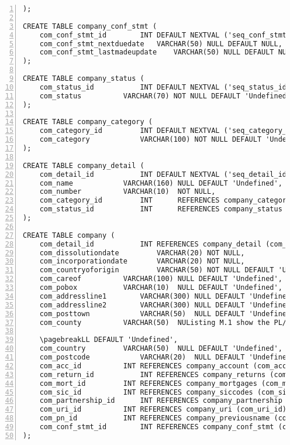\begin{lstlisting}[breaklines, frame=single, numbers=left, caption={PL/pgSQL's DDL scripts for Company Normalized Table Creation.}, label=commandline-02]
); 

CREATE TABLE company_conf_stmt (
	com_conf_stmt_id	 	INT DEFAULT NEXTVAL ('seq_conf_stmt_id') PRIMARY KEY, 
	com_conf_stmt_nextduedate	VARCHAR(50) NULL DEFAULT NULL,
	com_conf_stmt_lastmadeupdate 	VARCHAR(50) NULL DEFAULT NULL
);

CREATE TABLE company_status ( 
	com_status_id	 		INT DEFAULT NEXTVAL ('seq_status_id') PRIMARY KEY, 
	com_status 			VARCHAR(70) NOT NULL DEFAULT 'Undefined'
);

CREATE TABLE company_category ( 
	com_category_id		 	INT DEFAULT NEXTVAL ('seq_category_id') PRIMARY KEY, 
	com_category 			VARCHAR(100) NOT NULL DEFAULT 'Undefined'
); 

CREATE TABLE company_detail ( 
	com_detail_id	 		INT DEFAULT NEXTVAL ('seq_detail_id') PRIMARY KEY,
	com_name			VARCHAR(160) NULL DEFAULT 'Undefined', 
	com_number 			VARCHAR(10)  NOT NULL, 
	com_category_id			INT	     REFERENCES company_category (com_category_id),
	com_status_id			INT	     REFERENCES company_status (com_status_id), 	     	
);

CREATE TABLE company ( 
	com_detail_id  			INT REFERENCES company_detail (com_detail_id), 
	com_dissolutiondate     	VARCHAR(20) NOT NULL, 
	com_incorporationdate		VARCHAR(20) NOT NULL, 
	com_countryoforigin 		VARCHAR(50) NOT NULL DEFAULT 'Undefined',
	com_careof			VARCHAR(100) NULL DEFAULT 'Undefined',
	com_pobox 			VARCHAR(10)  NULL DEFAULT 'Undefined', 
	com_addressline1		VARCHAR(300) NULL DEFAULT 'Undefined', 
	com_addressline2		VARCHAR(300) NULL DEFAULT 'Undefined', 
	com_posttown 			VARCHAR(50)  NULL DEFAULT 'Undefined', 
	com_county 			VARCHAR(50)  NUListing M.1 show the PL/pgSQL's Data Definition Language (DDL) scripts to create Postcode Normalized table based on database design shown in Section 3.6.2.3. All the table are defined with PRIMARY KEY (PK) and establish referencial integrity relationship amongs entity to form a good relational database design. Moreover, the data types are defined correctly with sufficient memory provided on each columns.
	
	\pagebreakLL DEFAULT 'Undefined',
	com_country			VARCHAR(50)  NULL DEFAULT 'Undefined', 
	com_postcode 			VARCHAR(20)  NULL DEFAULT 'Undefined',
	com_acc_id 			INT REFERENCES company_account (com_acc_id), 
	com_return_id			INT REFERENCES company_returns (com_return_id), 
	com_mort_id			INT REFERENCES company_mortgages (com_mort_id), 
	com_sic_id			INT REFERENCES company_siccodes (com_sic_id),
	com_partnership_id		INT REFERENCES company_partnership (com_partnership_id),
	com_uri_id			INT REFERENCES company_uri (com_uri_id),
	com_pn_id			INT REFERENCES company_previousname (com_pn_id),
	com_conf_stmt_id		INT REFERENCES company_conf_stmt (com_conf_stmt_id)
);

\end{lstlisting}

